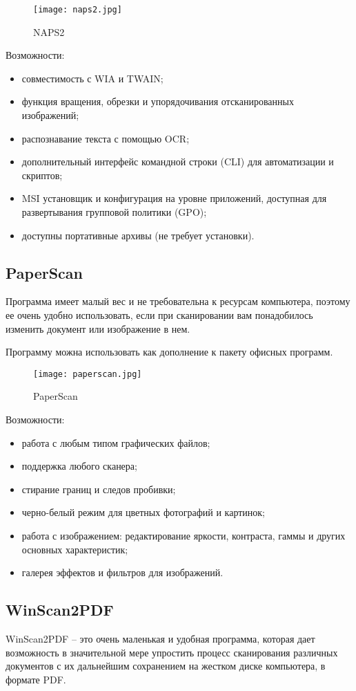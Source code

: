 \begin{figure}[h!]
	\centering
	\texttt{[image: naps2.jpg]}
	\caption{NAPS2}
\end{figure}

Возможности:
\begin{itemize}
	\item совместимость с WIA и TWAIN;
	\item функция вращения, обрезки и упорядочивания отсканированных изображений;
	\item распознавание текста с помощью OCR;
	\item дополнительный интерфейс командной строки (CLI) для автоматизации и скриптов;
	\item MSI установщик и конфигурация на уровне приложений, доступная для развертывания групповой политики (GPO);
	\item доступны портативные архивы (не требует установки).
\end{itemize}

\subsection{PaperScan}
Программа имеет малый вес и не требовательна к ресурсам компьютера, поэтому ее очень удобно использовать, если при сканировании вам понадобилось изменить документ или изображение в нем.

Программу можна использовать как дополнение к пакету офисных программ.

\begin{figure}[h!]
	\centering
	\texttt{[image: paperscan.jpg]}
	\caption{PaperScan}
\end{figure}

Возможности:
\begin{itemize}
	\item работа с любым типом графических файлов;
	\item поддержка любого сканера;
	\item стирание границ и следов пробивки;
	\item черно-белый режим для цветных фотографий и картинок;
	\item работа с изображением: редактирование яркости, контраста, гаммы и других основных характеристик;
	\item галерея эффектов и фильтров для изображений.
\end{itemize}

\subsection{WinScan2PDF}
WinScan2PDF – это очень маленькая и удобная программа, которая дает возможность в значительной мере упростить процесс сканирования различных документов с их дальнейшим сохранением на жестком диске компьютера, в формате PDF.

